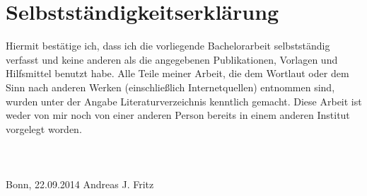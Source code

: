 \chapter*{Selbstständigkeitserklärung}

Hiermit bestätige ich, dass ich die vorliegende Bachelorarbeit selbstständig verfasst und keine anderen als die angegebenen Publikationen, Vorlagen und Hilfsmittel benutzt habe. Alle Teile meiner Arbeit, die dem Wortlaut oder dem Sinn nach anderen Werken (einschließlich Internetquellen) entnommen sind, wurden unter der Angabe Literaturverzeichnis kenntlich gemacht. Diese Arbeit ist weder von mir noch von einer anderen Person bereits in einem anderen Institut vorgelegt worden.
\\
\\
\\
\\
Bonn, 22.09.2014 \hspace{5em} Andreas J. Fritz